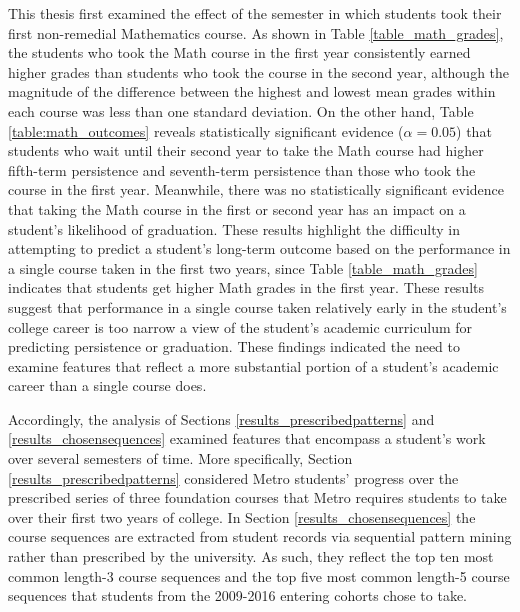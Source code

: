 This thesis first examined the effect of the semester in which students took their first non-remedial Mathematics course.  As shown in Table \ref{table_math_grades}, the students who took the Math course in the first year consistently earned higher grades than students who took the course in the second year, although the magnitude of the difference between the highest and lowest mean grades within each course was less than one standard deviation.  On the other hand, Table \ref{table:math_outcomes} reveals statistically significant evidence ($\alpha = 0.05$) that students who wait until their second year to take the Math course had higher fifth-term persistence and seventh-term persistence than those who took the course in the first year.  Meanwhile, there was no statistically significant evidence that taking the Math course in the first or second year has an impact on a student's likelihood of graduation.  These results highlight the difficulty in attempting to predict a student's long-term outcome based on the performance in a single course taken in the first two years, since Table \ref{table_math_grades} indicates that students get higher Math grades in the first year.  These results suggest that performance in a single course taken relatively early in the student's college career is too narrow a view of the student's academic curriculum for predicting persistence or graduation.  These findings indicated the need to examine features that reflect a more substantial portion of a student's academic career than a single course does.  

Accordingly, the analysis of Sections \ref{results_prescribedpatterns} and \ref{results_chosensequences} examined features that encompass a student's work over several semesters of time.  More specifically, Section \ref{results_prescribedpatterns} considered Metro students' progress over the prescribed series of three foundation courses that Metro requires students to take over their first two years of college.  In Section \ref{results_chosensequences} the course sequences are extracted from student records via sequential pattern mining rather than prescribed by the university.  As such, they reflect the top ten most common length-3 course sequences and the top five most common length-5 course sequences that students from the 2009-2016 entering cohorts chose to take.  

